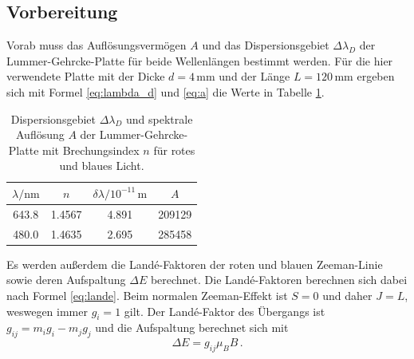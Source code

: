 \subsection{Vorbereitung}
Vorab muss das Auflösungsvermögen $A$ und das Dispersionsgebiet $\Delta \lambda_D$ der Lummer-Gehrcke-Platte 
für beide Wellenlängen bestimmt werden. Für die hier verwendete Platte mit der Dicke $d = 4 \, \si{\milli\meter}$ und 
der Länge $L = 120 \, \si{\milli\meter}$ ergeben sich mit Formel \eqref{eq:lambda_d} und \eqref{eq:a} die Werte in Tabelle \ref{tab:atab0}.
\FloatBarrier
\begin{table}[h]
    \centering
    \caption{Dispersionsgebiet $\Delta \lambda_D$ und spektrale Auflösung $A$ der Lummer-Gehrcke-Platte mit Brechungsindex $n$ für rotes und blaues Licht.}
    \label{tab:atab0}
    \begin{tabular}{c c c c}
        \toprule
        {$\lambda / \si{\nano\meter}$} & {$n$} & {$\delta \lambda / 10^{-11}\, \si{\meter}$} & {$A$}\\
        \midrule
        643.8 & 1.4567 & 4.891 & 209129 \\
        480.0 & 1.4635 & 2.695 & 285458 \\
        \bottomrule
    \end{tabular}
\end{table}
\FloatBarrier
\noindent
Es werden außerdem die Landé-Faktoren der roten und blauen Zeeman-Linie sowie deren Aufspaltung $\Delta E$ berechnet.
Die Landé-Faktoren berechnen sich dabei nach Formel \eqref{eq:lande}. Beim normalen Zeeman-Effekt ist $S = 0$ und daher
$J = L$, weswegen immer $g_i = 1$ gilt. Der Landé-Faktor des Übergangs ist $g_{ij} = m_i g_i - m_j g_j$ und die Aufspaltung
berechnet sich mit
\begin{equation*}
    \Delta E = g_{ij} \mu_B B \, .
\end{equation*}
\FloatBarrier
